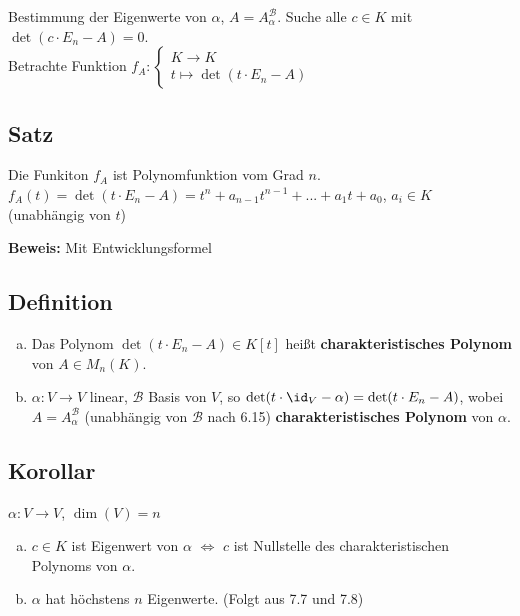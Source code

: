   Bestimmung der Eigenwerte von $\alpha$, $A=A_\alpha^{\mathcal{B}}$. Suche alle $c\in
  K$ mit $\det(c\cdot E_n-A)=0$.\\
  Betrachte Funktion $f_A:\begin{cases}K\rightarrow K\\t\mapsto\det(t\cdot
  E_n-A)\end{cases}$

\subsection{Satz}
  Die Funkiton $f_A$ ist Polynomfunktion vom Grad $n$.\\
  $f_A(t)=\det(t\cdot E_n-A)=t^n+a_{n-1}t^{n-1}+...+a_1t+a_0$, $a_i\in K$
  (unabhängig von $t$)

  \textbf{Beweis:} Mit Entwicklungsformel

\subsection{Definition}
  \begin{enumerate}[a)]
    \item Das Polynom $\det(t\cdot E_n-A)\in K[t]$ heißt
      \textbf{charakteristisches Polynom} von $A\in M_n(K)$.
    \item $\alpha:V\rightarrow V$ linear, $\mathcal{B}$ Basis von $V$, so
      $\det(t\cdot\id_V-\alpha)=\det(t\cdot E_n-A)$, wobei
      $A=A_\alpha^{\mathcal{B}}$ (unabhängig von ${\mathcal{B}}$ nach 6.15)
      \textbf{charakteristisches Polynom} von $\alpha$.
  \end{enumerate}
  
\subsection{Korollar}
  $\alpha:V\rightarrow V$, $\dim(V)=n$
  \begin{enumerate}[a)]
    \item $c\in K$ ist Eigenwert von $\alpha$ $\Leftrightarrow$ $c$ ist
      Nullstelle des charakteristischen Polynoms von $\alpha$.
    \item $\alpha$ hat höchstens $n$ Eigenwerte. (Folgt aus 7.7 und 7.8)
  \end{enumerate}

